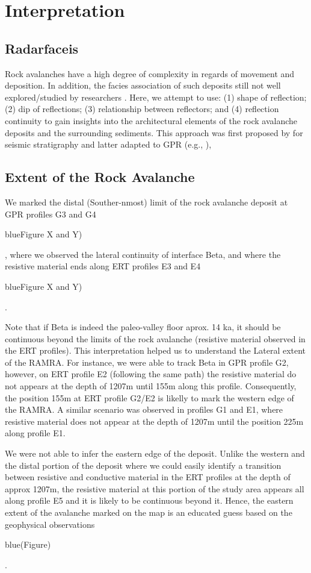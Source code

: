 \documentclass[5p]{elsarticle}
\newcommand{\COMON}{\begin{color}{blue}}
\newcommand{\COMOFF}{\end{color}}
\begin{document}
										
\section{Interpretation}

    \subsection{Radarfaceis}
    
Rock avalanches have a high degree of complexity in regards of movement and deposition. In addition, the facies association of such deposits still not well explored/studied by researchers \citep{otto2006comparing}. Here, we attempt to use: (1) shape of reflection; (2) dip of reflections; (3) relationship between reflectors; and (4) reflection continuity to gain insights into the architectural elements of the rock avalanche deposits and the surrounding sediments. This approach was first proposed by \cite{mitchum1977seismic} for seismic stratigraphy and latter adapted to GPR (e.g., \cite{neal2004ground}),


    \subsection{Extent of the Rock Avalanche}
   
We marked the distal (Souther-nmost) limit of the rock avalanche deposit at GPR profiles G3 and G4 \COMON Figure X and Y) \COMOFF, where we observed the lateral continuity of interface Beta, and where the resistive material ends along ERT profiles E3 and E4 \COMON Figure X and Y) \COMOFF.   
    
Note that if Beta is indeed the paleo-valley floor aprox. 14 ka, it should be continuous beyond the limits of the rock avalanche (resistive material observed in the ERT profiles). This interpretation helped us to understand the Lateral extent of the RAMRA. For instance, we were able to track Beta in GPR profile G2, however, on ERT profile E2 (following the same path) the resistive material do not appears at the depth of 1207m until 155m along this profile. Consequently, the position 155m at ERT profile G2/E2 is likelly to mark the western edge of the RAMRA. A similar scenario was observed in profiles G1 and E1, where resistive material does not appear at the depth of 1207m until the position 225m along profile E1.

We were not able to infer the eastern edge of the deposit. Unlike the western and the distal portion of the deposit where we could easily identify a transition between resistive and conductive material in the ERT profiles at the depth of approx 1207m, the resistive material at this portion of the study area appears all along profile E5 and it is likely to be continuous beyond it. Hence, the eastern extent of the avalanche marked on the map is an educated guess based on the geophysical observations \COMON (Figure) \COMOFF.
    
\end{document}
